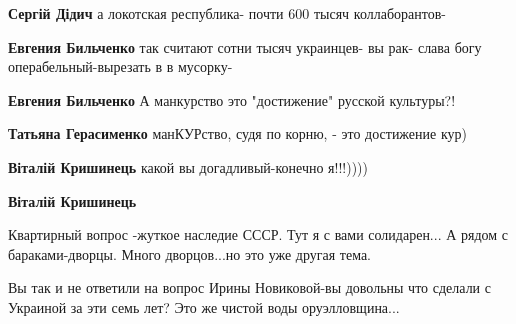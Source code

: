 \begin{itemize}
\begin{itemize}
\textbf{Сергій Дідич} а локотская республика- почти 600 тысяч коллаборантов-

 
\textbf{Евгения Бильченко} так считают сотни тысяч украинцев- вы рак- слава богу операбельный-вырезать в в мусорку-

 
\textbf{Евгения Бильченко} А манкурство это "достижение" русской культуры?!

 
\textbf{Татьяна Герасименко} манКУРство, судя по корню, - это достижение кур)

 
\textbf{Віталій Кришинець} какой вы догадливый-конечно я!!!))))

 
\textbf{Віталій Кришинець} 

Квартирный вопрос -жуткое наследие СССР. Тут я с вами солидарен... А рядом с
бараками-дворцы. Много дворцов...но это уже другая тема. 

Вы так и не ответили на вопрос Ирины Новиковой-вы довольны что сделали с
Украиной за эти семь лет? Это же чистой воды оруэлловщина...

 

\end{itemize}
\end{itemize}
